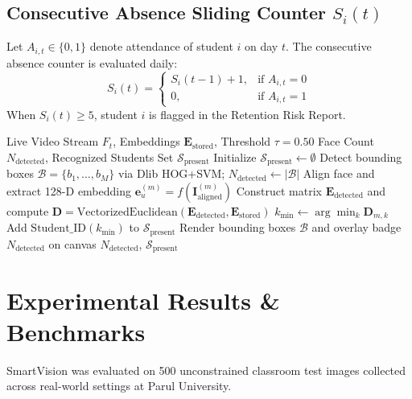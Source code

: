 \documentclass[10pt,journal,compsoc,twocolumn,a4paper]{IEEEtran}
\begin{document}
\subsection{Consecutive Absence Sliding Counter $S_i(t)$}
Let $A_{i,t} \in \{0, 1\}$ denote attendance of student $i$ on day $t$. The consecutive absence counter is evaluated daily:
\begin{equation}
S_i(t) = \begin{cases} 
S_i(t-1) + 1, & \text{if } A_{i,t} = 0 \\ 
0, & \text{if } A_{i,t} = 1 
\end{cases}
\end{equation}
When $S_i(t) \ge 5$, student $i$ is flagged in the Retention Risk Report.

\begin{algorithm}[htbp]
\caption{Live WebRTC Multi-Student Face Counting \& Identification}
\label{alg:live_detection}
\begin{algorithmic}[1]
\REQUIRE Live Video Stream $F_t$, Embeddings $\mathbf{E}_{\text{stored}}$, Threshold $\tau = 0.50$
\ENSURE Face Count $N_{\text{detected}}$, Recognized Students Set $\mathcal{S}_{\text{present}}$
\STATE Initialize $\mathcal{S}_{\text{present}} \leftarrow \emptyset$
\STATE Detect bounding boxes $\mathcal{B} = \{b_1, \dots, b_M\}$ via Dlib HOG+SVM; $N_{\text{detected}} \leftarrow |\mathcal{B}|$
    \STATE Align face and extract 128-D embedding $\mathbf{e}_u^{(m)} = f(\mathbf{I}_{\text{aligned}}^{(m)})$
\ENDFOR
\STATE Construct matrix $\mathbf{E}_{\text{detected}}$ and compute $\mathbf{D} = \text{VectorizedEuclidean}(\mathbf{E}_{\text{detected}}, \mathbf{E}_{\text{stored}})$
    \STATE $k_{\text{min}} \leftarrow \arg\min_k \mathbf{D}_{m,k}$
        \STATE Add $\text{Student\_ID}(k_{\text{min}})$ to $\mathcal{S}_{\text{present}}$
    \ENDIF
\ENDFOR
\STATE Render bounding boxes $\mathcal{B}$ and overlay badge $N_{\text{detected}}$ on canvas
\RETURN $N_{\text{detected}}$, $\mathcal{S}_{\text{present}}$
\end{algorithmic}
\end{algorithm}

\section{Experimental Results \& Benchmarks}
SmartVision was evaluated on 500 unconstrained classroom test images collected across real-world settings at Parul University.
\end{document}
